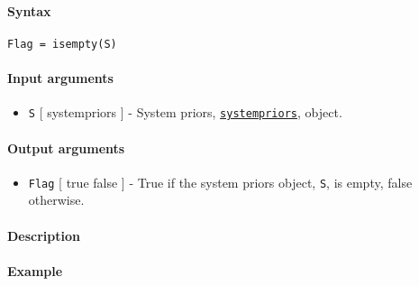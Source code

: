


	\paragraph{Syntax}

\begin{verbatim}
Flag = isempty(S)
\end{verbatim}

\paragraph{Input arguments}

\begin{itemize}
\itemsep1pt\parskip0pt
\item
  \texttt{S} {[} systempriors {]} - System priors,
  \href{systempriors/Contents}{\texttt{systempriors}}, object.
\end{itemize}

\paragraph{Output arguments}

\begin{itemize}
\itemsep1pt\parskip0pt
\item
  \texttt{Flag} {[} true \textbar{} false {]} - True if the system
  priors object, \texttt{S}, is empty, false otherwise.
\end{itemize}

\paragraph{Description}

\paragraph{Example}


